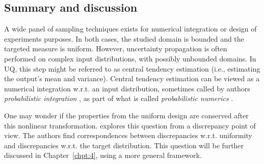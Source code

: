 \subsection{Summary and discussion}
A wide panel of sampling techniques exists for numerical integration or design of experiments purposes. 
In both cases, the studied domain is bounded and the targeted measure is uniform. 
However, uncertainty propagation is often performed on complex input distributions, with possibly unbounded domains. 
In UQ, this step might be referred to as central tendency estimation (i.e., estimating the output's mean and variance). 
Central tendency estimation can be viewed as a numerical integration w.r.t. an input distribution, sometimes called by authors \textit{probabilistic integration} \citep{briol_oates_2019}, as part of what is called \textit{probabilistic numerics} \citep{oates_sullivan_2019}.  


One may wonder if the properties from the uniform design are conserved after this nonlinear transformation. 
\citet{hickernell_2020} explores this question from a discrepancy point of view. 
The authors find correspondences between discrepancies w.r.t. uniformity and discrepancies w.r.t. the target distribution. 
This question will be further discussed in Chapter~\ref{chpt:4}, using a more general framework.


